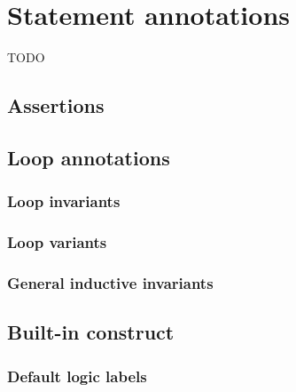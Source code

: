 \section{Statement annotations}

TODO


\subsection{Assertions}


\subsection{Loop annotations}
\label{sec:loop_annot}

\subsubsection{Loop invariants}

\subsubsection{Loop variants}

\subsubsection{General inductive invariants}


\subsection{Built-in construct \texorpdfstring{\at}{\textbackslash{}at}}
\label{sec:at}

\subsubsection*{Default logic labels}\label{sec:default-logic-labels}


